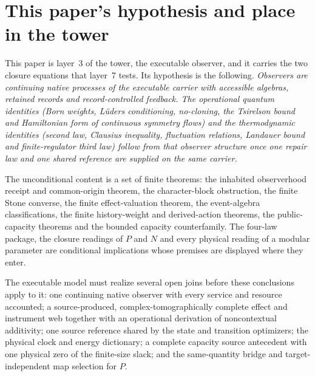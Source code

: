\documentclass[11pt]{article}
\begin{document}




\section*{This paper's hypothesis and place in the tower}
\label{sec:observers-hypothesis}

This paper is layer~3 of the tower, the executable observer, and it carries
the two closure equations that layer~7 tests. Its hypothesis is the following.
\emph{Observers are continuing native processes of the executable carrier
with accessible algebras, retained records and record-controlled feedback.
The operational quantum identities (Born weights, L\"uders conditioning,
no-cloning, the Tsirelson bound and Hamiltonian form of continuous symmetry
flows) and the thermodynamic identities (second law, Clausius inequality,
fluctuation relations, Landauer bound and finite-regulator third law) follow
from that observer structure once one repair law and one shared reference are
supplied on the same carrier.}

The unconditional content is a set of finite theorems: the inhabited
observerhood receipt and common-origin theorem, the character-block
obstruction, the finite Stone converse, the finite effect-valuation theorem,
the event-algebra classifications, the finite history-weight and derived-action
theorems, the public-capacity theorems and the bounded capacity counterfamily.
The four-law package, the closure readings of \(P\) and \(N\) and every
physical reading of a modular parameter are conditional implications whose
premises are displayed where they enter.

The executable model must realize several open joins before these conclusions
apply to it: one continuing native observer with every service and resource
accounted; a source-produced, complex-tomographically complete effect and
instrument web together with an operational derivation of noncontextual
additivity; one source reference shared by the state and transition
optimizers; the physical clock and energy dictionary; a complete capacity
source antecedent with one physical zero of the finite-size slack; and the
same-quantity bridge and target-independent map selection for \(P\).
\end{document}
